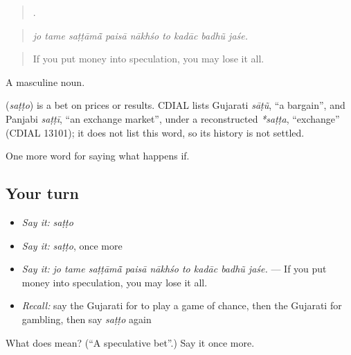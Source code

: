 \begin{quote}
        .
\end{quote}

\begin{quote}
\emph{jo tame saṭṭāmā̃ paisā nākhśo to kadāc badhũ jaśe.}
\end{quote}

\begin{quote}
If you put money into speculation, you may lose it all.
\end{quote}

A masculine noun.

\begin{cousinweb}
\textbf{} (\emph{saṭṭo}) is a bet on prices or results. CDIAL lists Gujarati \emph{sāṭũ}, \textquotedblleft{}a bargain\textquotedblright{}, and Panjabi \emph{saṭṭī}, \textquotedblleft{}an exchange market\textquotedblright{}, under a reconstructed \emph{*saṭṭa}, \textquotedblleft{}exchange\textquotedblright{} (CDIAL 13101); it does not list this word, so its history is not settled.
\end{cousinweb}

\begin{grammarlens}[title={What you've built}]
One more word for saying what happens if.
\end{grammarlens}

\subsection*{Your turn}
\begin{itemize}
\raggedright
  \item \emph{Say it:} \emph{saṭṭo}
  \item \emph{Say it:} \emph{saṭṭo}, once more
  \item \emph{Say it:} \emph{jo tame saṭṭāmā̃ paisā nākhśo to kadāc badhũ jaśe.} — If you put money into speculation, you may lose it all.
  \item \emph{Recall:} say the Gujarati for to play a game of chance, then the Gujarati for gambling, then say \emph{saṭṭo} again
\end{itemize}

\begin{tcolorbox}[breakable,colback=teal!4,colframe=teal!35!black,title={Before you move on}]
What does  mean? (\textquotedblleft{}A speculative bet\textquotedblright{}.) Say it once more.
\end{tcolorbox}
